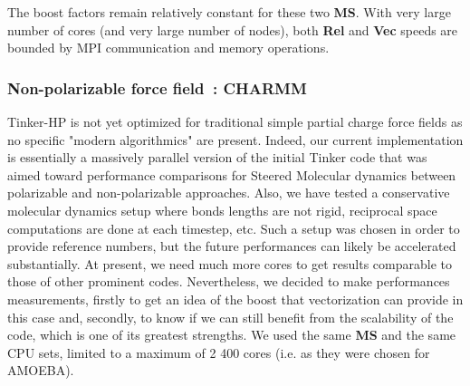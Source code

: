 \documentclass[9pt,comparison]{livecoms}
\begin{document}
The boost factors remain relatively constant for these two \textbf{MS}. With very large number of cores (and very large number of nodes), both \textbf{Rel} and \textbf{Vec} speeds are bounded by MPI communication and memory operations. 
\subsubsection{Non-polarizable force field~: CHARMM}
\hspace{\parindent}Tinker-HP is not yet optimized for traditional simple partial charge force fields as no specific "modern algorithmics" are present. Indeed, our current implementation is essentially a massively parallel version of the initial Tinker code that was aimed toward performance comparisons for Steered Molecular dynamics between polarizable and non-polarizable approaches.\cite{SMD-Tinker} Also, we have tested a conservative molecular dynamics setup where bonds lengths are not rigid, reciprocal space computations are done at each timestep, etc. Such a setup was chosen in order to provide reference numbers, but the future performances can likely be accelerated substantially. At present, we need much more cores to get results comparable to those of other prominent codes\cite{GROMACS,NAMD,GENESIS,Bowers_2006}. Nevertheless, we decided to make performances measurements, firstly to get an idea of the boost that vectorization can provide in this case and, secondly, to know if we can still benefit from the scalability of the code, which is one of its greatest strengths. We used the same \textbf{MS} and the same CPU sets, limited to a maximum of 2 400 cores (i.e. as they were chosen for AMOEBA). 
\end{document}
